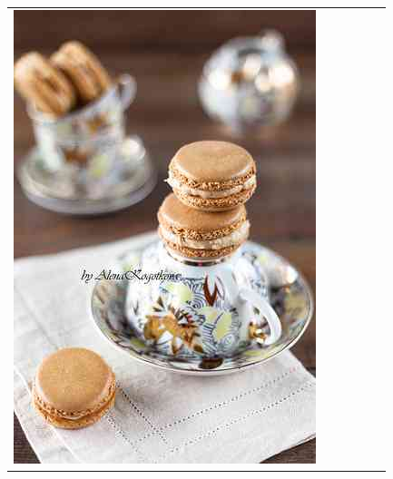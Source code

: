 \begin{figure}
\begin{tabular}{m{.01\linewidth} m{.16\linewidth} m{.16\linewidth} m{.16\linewidth} m{.16\linewidth} m{.16\linewidth}}
    \includegraphics[width=\linewidth]{../style/figures/flickr_on_flickr/pred_style_Romantic/2.jpg} &

\end{tabular}
\end{figure}
